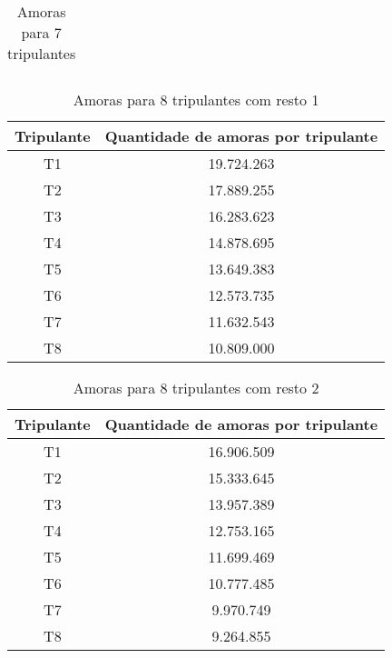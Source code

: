 \documentclass[12pt]{article}
\begin{document}
\begin{table}[H]
\begin{tabular}{|c|c|c|}
\end{tabular}
\label{Tabela4}
\caption{Amoras para 7 tripulantes}

\end{table}

\begin{table}[H]

\centering

\begin{tabular}{|c|c|}

\hline
Tripulante & Quantidade de amoras por tripulante \\
\hline
T1 & 19.724.263 \\
\hline
T2 & 17.889.255 \\
\hline
T3 & 16.283.623 \\
\hline
T4 & 14.878.695 \\
\hline
T5 & 13.649.383 \\
\hline
T6 & 12.573.735 \\
\hline
T7 & 11.632.543 \\
\hline
T8 & 10.809.000 \\
\hline

\end{tabular}
\label{Tabela5}
\caption{Amoras para 8 tripulantes com resto 1}

\end{table}

\begin{table}[H]

\centering

\begin{tabular}{|c|c|}

\hline
Tripulante & Quantidade de amoras por tripulante \\
\hline
T1 & 16.906.509 \\
\hline
T2 & 15.333.645 \\
\hline
T3 & 13.957.389 \\
\hline
T4 & 12.753.165 \\
\hline
T5 & 11.699.469 \\
\hline
T6 & 10.777.485 \\
\hline
T7 & 9.970.749 \\
\hline
T8 & 9.264.855 \\
\hline

\end{tabular}
\label{Tabela6}
\caption{Amoras para 8 tripulantes com resto 2}

\end{table}
\end{document}
